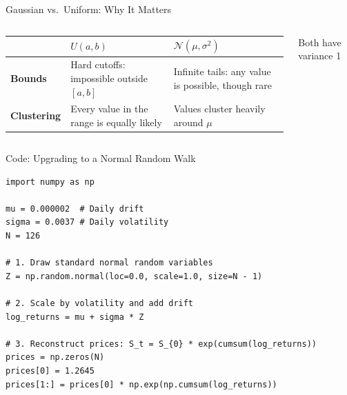 \documentclass[aspectratio=169,11pt]{beamer}
\begin{document}
\begin{frame}{Gaussian vs.\ Uniform: Why It Matters}
  \begin{columns}[T]
    \begin{column}{0.52\textwidth}
      \small
      \begin{tabularx}{\textwidth}{>{\bfseries}l Y Y}
        \toprule
        & $U(a, b)$ & $\mathcal{N}(\mu, \sigma^2)$ \\
        \midrule
        Bounds & Hard cutoffs: impossible outside $[a, b]$ & Infinite tails: any value is possible, though rare \\
        \addlinespace
        Clustering & Every value in the range is equally likely & Values cluster heavily around $\mu$ \\
        \bottomrule
      \end{tabularx}
    \end{column}
    \begin{column}{0.44\textwidth}
      \centering

      {\scriptsize Both have variance 1}
    \end{column}
  \end{columns}
\end{frame}

\begin{frame}[fragile]{Code: Upgrading to a Normal Random Walk}
\begin{lstlisting}[basicstyle=\ttfamily\scriptsize]
import numpy as np

mu = 0.000002  # Daily drift
sigma = 0.0037 # Daily volatility
N = 126

# 1. Draw standard normal random variables
Z = np.random.normal(loc=0.0, scale=1.0, size=N - 1)

# 2. Scale by volatility and add drift
log_returns = mu + sigma * Z

# 3. Reconstruct prices: S_t = S_{0} * exp(cumsum(log_returns))
prices = np.zeros(N)
prices[0] = 1.2645
prices[1:] = prices[0] * np.exp(np.cumsum(log_returns))
\end{lstlisting}
\end{frame}
\end{document}
